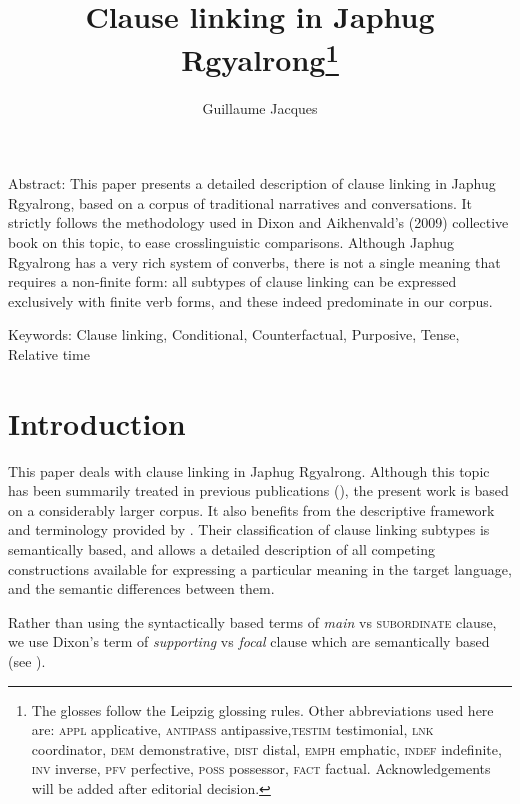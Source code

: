 \documentclass[oldfontcommands,oneside,a4paper,11pt]{article}
\begin{document}
 
\linenumbers
\title{Clause linking in Japhug Rgyalrong\footnote{
The glosses follow the Leipzig glossing rules. Other abbreviations used here are: \textsc{appl} applicative, \textsc{antipass} antipassive,\textsc{testim} testimonial, \textsc{lnk} coordinator, \textsc{dem} demonstrative, \textsc{dist} distal, \textsc{emph} emphatic, \textsc{indef} indefinite, \textsc{inv} inverse,  \textsc{pfv} perfective, \textsc{poss} possessor, \textsc{fact} factual. %
Acknowledgements will be added after editorial decision.  
} }
\author{Guillaume Jacques}
\maketitle

Abstract: This paper presents a detailed description of clause linking in Japhug Rgyalrong, based on a corpus of traditional narratives and conversations. It strictly follows the methodology used in Dixon and Aikhenvald's (2009) collective book on this topic, to ease crosslinguistic comparisons. Although Japhug Rgyalrong has a very rich system of converbs, there is not a single meaning that requires a non-finite form: all subtypes of clause linking can be expressed exclusively with finite verb forms, and these indeed predominate in our corpus.

Keywords: Clause linking, Conditional, Counterfactual, Purposive, Tense, Relative time 

\section{Introduction}

This paper  deals with clause linking in Japhug Rgyalrong. Although this topic has been summarily treated in previous publications (\citealt[317-325]{jacques08zh}), the present work is based on a considerably larger corpus. It also benefits from the descriptive framework and terminology provided by \citet{dixon09clause.linking}. Their classification of clause linking subtypes is semantically based, and allows a detailed description of all competing constructions available for expressing a particular meaning in the target language, and the semantic differences between them.

Rather than using the syntactically based terms of \textit{main} vs \textsc{subordinate} clause, we use Dixon's term of \textit{supporting}   vs \textit{focal} clause  which are semantically based (see \citealt[2-5]{dixon09intro}).
\end{document}
